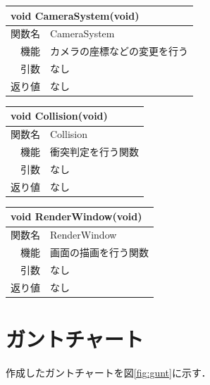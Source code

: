 \documentclass{jarticle}
\begin{document}
\begin{table}[H]
\begin{tabular}{|r|l|}
\hline
\multicolumn{2}{|l|}{void CameraSystem(void)}       \\ \hline
関数名           & CameraSystem  \\ \hline
機能     & カメラの座標などの変更を行う  \\
引数 	 	 & なし \\ 
返り値	 & なし \\ \hline
\end{tabular}
\end{table}

\begin{table}[H]
\begin{tabular}{|r|l|}
\hline
\multicolumn{2}{|l|}{void Collision(void)}       \\ \hline
関数名           & Collision  \\ \hline
機能     & 衝突判定を行う関数  \\
引数 	 	 & なし \\ 
返り値	 & なし \\ \hline
\end{tabular}
\end{table}

\begin{table}[H]
\begin{tabular}{|r|l|}
\hline
\multicolumn{2}{|l|}{void RenderWindow(void)}       \\ \hline
関数名           & RenderWindow  \\ \hline
機能     & 画面の描画を行う関数  \\
引数 	 	 & なし \\ 
返り値	 & なし \\ \hline
\end{tabular}
\end{table}


\section{ガントチャート}
作成したガントチャートを図\ref{fig:gunt}に示す．
\end{document}
